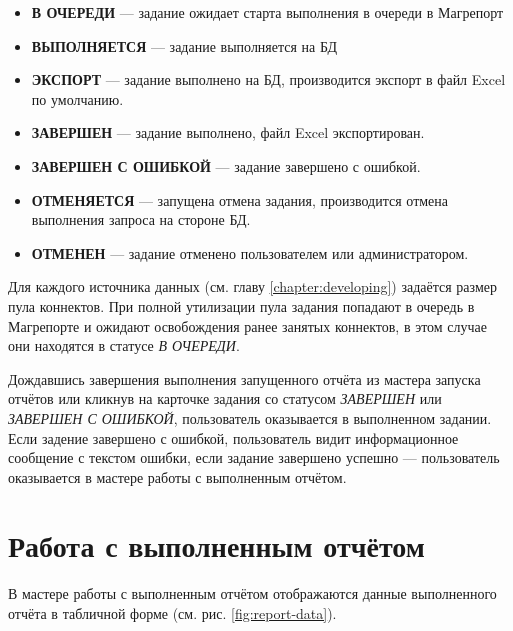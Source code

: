 \documentclass[../user-manual.tex]{subfiles}
\begin{document}
	\begin{itemize}
		\item \textbf{В ОЧЕРЕДИ} --- задание ожидает старта выполнения в очереди в Магрепорт
		
		\item \textbf{ВЫПОЛНЯЕТСЯ} --- задание выполняется на БД
		
		\item \textbf{ЭКСПОРТ} --- задание выполнено на БД, производится экспорт в файл Excel по умолчанию.
		
		\item \textbf{ЗАВЕРШЕН} --- задание выполнено, файл Excel экспортирован.
		
		\item \textbf{ЗАВЕРШЕН С ОШИБКОЙ} --- задание завершено с ошибкой.
		
		\item \textbf{ОТМЕНЯЕТСЯ} --- запущена отмена задания, производится отмена выполнения запроса на стороне БД.
		
		\item \textbf{ОТМЕНЕН} --- задание отменено пользователем или администратором.
		
	\end{itemize}

	\begin{devnote}
		Для каждого источника данных (см. главу \ref{chapter:developing}) задаётся размер пула коннектов. При полной утилизации пула задания попадают в очередь в Магрепорте и ожидают освобождения ранее занятых коннектов, в этом случае они находятся в статусе \textit{В ОЧЕРЕДИ}.
	\end{devnote}

	Дождавшись завершения выполнения запущенного отчёта из мастера запуска отчётов или кликнув на карточке задания со статусом \textit{ЗАВЕРШЕН} или \textit{ЗАВЕРШЕН С ОШИБКОЙ}, пользователь оказывается в выполненном задании. Если задение завершено с ошибкой, пользователь видит информационное сообщение с текстом ошибки, если задание завершено успешно --- пользователь оказывается в мастере работы с выполненным отчётом.
	
	\section{Работа с выполненным отчётом}
	
	В мастере работы с выполненным отчётом отображаются данные выполненного отчёта в табличной форме (см. рис. \ref{fig:report-data}).
		
\end{document}
